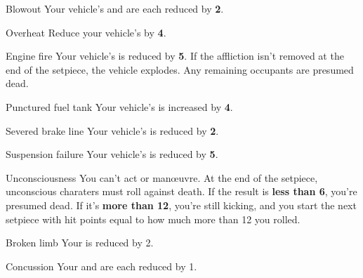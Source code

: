 
\begin{describe}{Blowout}
  Your vehicle's  and  are each reduced by \textbf{2}.
\end{describe}

\begin{describe}{Overheat}
  Reduce your vehicle's  by \textbf{4}.
\end{describe}

\begin{describe}{Engine fire}
  Your vehicle's  is reduced by \textbf{5}. If the affliction isn't removed at the end of the setpiece, the vehicle explodes. Any remaining occupants are presumed dead.
\end{describe}

\begin{describe}{Punctured fuel tank}
  Your vehicle's  is increased by \textbf{4}.
\end{describe}

\begin{describe}{Severed brake line}
  Your vehicle's  is reduced by \textbf{2}.
\end{describe}

\begin{describe}{Suspension failure}
  Your vehicle's  is reduced by \textbf{5}.
\end{describe}

\hr

\begin{describe}{Unconsciousness}
  You can't act or man\oe{}uvre. At the end of the setpiece, unconscious charaters must roll \stat{\statSkill} against death. If the result is \textbf{less than 6}, you're presumed dead. If it's \textbf{more than 12}, you're still kicking, and you start the next setpiece with hit points equal to how much more than 12 you rolled.
\end{describe}

\begin{describe}{Broken limb}
  Your \stat{\statPhysical} is reduced by 2.
\end{describe}

\begin{describe}{Concussion}
  Your \stat{\statMental} and \stat{\statSkill} are each reduced by 1.
\end{describe}


